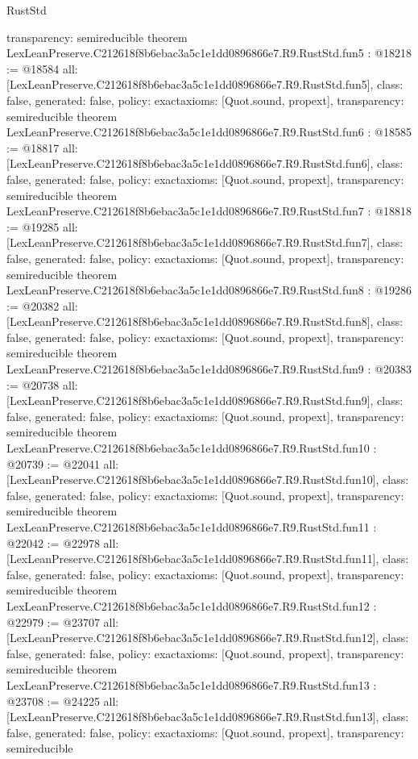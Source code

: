 \begin{lexlean}{RustStd}
\begin{coremodule}
{  transparency: semireducible
}
theorem LexLeanPreserve.C212618f8b6ebac3a5c1e1dd0896866e7.R9.RustStd.fun5 : @18218 := @18584 {
  all: [LexLeanPreserve.C212618f8b6ebac3a5c1e1dd0896866e7.R9.RustStd.fun5],
  class: false,
  generated: false,
  policy: exact{axioms: [Quot.sound, propext]},
  transparency: semireducible
}
theorem LexLeanPreserve.C212618f8b6ebac3a5c1e1dd0896866e7.R9.RustStd.fun6 : @18585 := @18817 {
  all: [LexLeanPreserve.C212618f8b6ebac3a5c1e1dd0896866e7.R9.RustStd.fun6],
  class: false,
  generated: false,
  policy: exact{axioms: [Quot.sound, propext]},
  transparency: semireducible
}
theorem LexLeanPreserve.C212618f8b6ebac3a5c1e1dd0896866e7.R9.RustStd.fun7 : @18818 := @19285 {
  all: [LexLeanPreserve.C212618f8b6ebac3a5c1e1dd0896866e7.R9.RustStd.fun7],
  class: false,
  generated: false,
  policy: exact{axioms: [Quot.sound, propext]},
  transparency: semireducible
}
theorem LexLeanPreserve.C212618f8b6ebac3a5c1e1dd0896866e7.R9.RustStd.fun8 : @19286 := @20382 {
  all: [LexLeanPreserve.C212618f8b6ebac3a5c1e1dd0896866e7.R9.RustStd.fun8],
  class: false,
  generated: false,
  policy: exact{axioms: [Quot.sound, propext]},
  transparency: semireducible
}
theorem LexLeanPreserve.C212618f8b6ebac3a5c1e1dd0896866e7.R9.RustStd.fun9 : @20383 := @20738 {
  all: [LexLeanPreserve.C212618f8b6ebac3a5c1e1dd0896866e7.R9.RustStd.fun9],
  class: false,
  generated: false,
  policy: exact{axioms: [Quot.sound, propext]},
  transparency: semireducible
}
theorem LexLeanPreserve.C212618f8b6ebac3a5c1e1dd0896866e7.R9.RustStd.fun10 : @20739 := @22041 {
  all: [LexLeanPreserve.C212618f8b6ebac3a5c1e1dd0896866e7.R9.RustStd.fun10],
  class: false,
  generated: false,
  policy: exact{axioms: [Quot.sound, propext]},
  transparency: semireducible
}
theorem LexLeanPreserve.C212618f8b6ebac3a5c1e1dd0896866e7.R9.RustStd.fun11 : @22042 := @22978 {
  all: [LexLeanPreserve.C212618f8b6ebac3a5c1e1dd0896866e7.R9.RustStd.fun11],
  class: false,
  generated: false,
  policy: exact{axioms: [Quot.sound, propext]},
  transparency: semireducible
}
theorem LexLeanPreserve.C212618f8b6ebac3a5c1e1dd0896866e7.R9.RustStd.fun12 : @22979 := @23707 {
  all: [LexLeanPreserve.C212618f8b6ebac3a5c1e1dd0896866e7.R9.RustStd.fun12],
  class: false,
  generated: false,
  policy: exact{axioms: [Quot.sound, propext]},
  transparency: semireducible
}
theorem LexLeanPreserve.C212618f8b6ebac3a5c1e1dd0896866e7.R9.RustStd.fun13 : @23708 := @24225 {
  all: [LexLeanPreserve.C212618f8b6ebac3a5c1e1dd0896866e7.R9.RustStd.fun13],
  class: false,
  generated: false,
  policy: exact{axioms: [Quot.sound, propext]},
  transparency: semireducible
}
\end{coremodule}
\end{lexlean}
